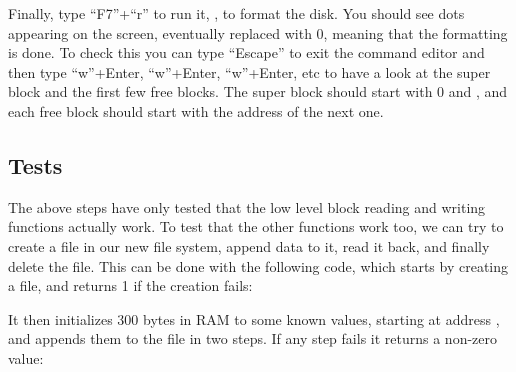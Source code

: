 Finally, type ``F7''+``r'' to run it, \ie, to format the disk. You should see
dots appearing on the screen, eventually replaced with 0, meaning that the
formatting is done. To check this you can type ``Escape'' to exit the command
editor and then type ``w''+Enter,
``w''+Enter,
``w''+Enter, etc to have a look at the super block
and the first few free blocks. The super block should start with 0 and
, and each free block should start with the address of the next one.


\subsection{Tests}


The above steps have only tested that the low level block reading and writing
functions actually work. To test that the other functions work too, we can try
to create a file in our new file system, append data to it, read it back, and
finally delete the file. This can be done with the following code, which starts
by creating a file, and returns 1 if the creation fails:


It then initializes 300 bytes in RAM to some known values, starting at address
, and appends them to the file in two steps. If any
step fails it returns a non-zero value:


